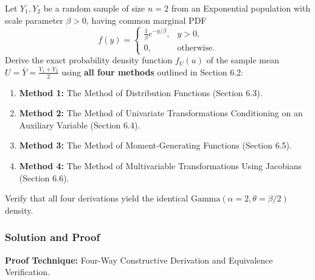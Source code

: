 \documentclass[11pt, letterpaper]{article}
\theoremstyle{definition}
\theoremstyle{remark}
\begin{document}
Let $Y_1, Y_2$ be a random sample of size $n=2$ from an Exponential population with scale parameter $\beta > 0$, having common marginal PDF
\[
    f(y) = \begin{cases} \frac{1}{\beta} e^{-y/\beta}, & y > 0, \\ 0, & \text{otherwise.} \end{cases}
\]
Derive the exact probability density function $f_U(u)$ of the sample mean $U = \bar{Y} = \frac{Y_1 + Y_2}{2}$ using \textbf{all four methods} outlined in Section 6.2:
\begin{enumerate}[label=(\alph*)]
    \item \textbf{Method 1:} The Method of Distribution Functions (Section 6.3).
    \item \textbf{Method 2:} The Method of Univariate Transformations Conditioning on an Auxiliary Variable (Section 6.4).
    \item \textbf{Method 3:} The Method of Moment-Generating Functions (Section 6.5).
    \item \textbf{Method 4:} The Method of Multivariable Transformations Using Jacobians (Section 6.6).
\end{enumerate}
Verify that all four derivations yield the identical $\text{Gamma}(\alpha = 2, \theta = \beta/2)$ density.

\subsubsection*{Solution and Proof}

\textbf{Proof Technique:} Four-Way Constructive Derivation and Equivalence Verification.
\end{document}
